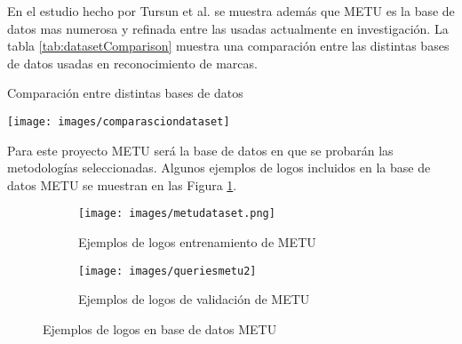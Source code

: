 \documentclass[conference]{IEEEtran}
\begin{document}
En el estudio hecho por Tursun et al. \cite{metuV2} se muestra además que METU es la base de datos mas numerosa y refinada entre las usadas actualmente en investigación. La tabla \ref{tab:datasetComparison} muestra una comparación entre las distintas bases de datos usadas en reconocimiento de marcas.
\begin{table}[h!]
	\caption{Comparación entre distintas bases de datos}
	\texttt{[image: images/comparasciondataset]}
	\label{tab:datasetComparison}
\end{table}

Para este proyecto METU será la base de datos en que se probarán las metodologías seleccionadas. Algunos ejemplos de logos incluidos en la base de datos METU se muestran en las Figura \ref{fig:logosMatu}.

\begin{figure}[h!]
\centering
	\begin{subfigure}[b]{0.8\linewidth}
		\texttt{[image: images/metudataset.png]}
		\caption{Ejemplos de logos entrenamiento de METU}
	\end{subfigure}

  	\begin{subfigure}[b]{0.8\linewidth}
		\texttt{[image: images/queriesmetu2]}
		\caption{Ejemplos de logos de validación de METU}
  	 \end{subfigure}
  	\caption{Ejemplos de logos en base de datos METU}
  	\label{fig:logosMatu}
\end{figure} 
\end{document}
